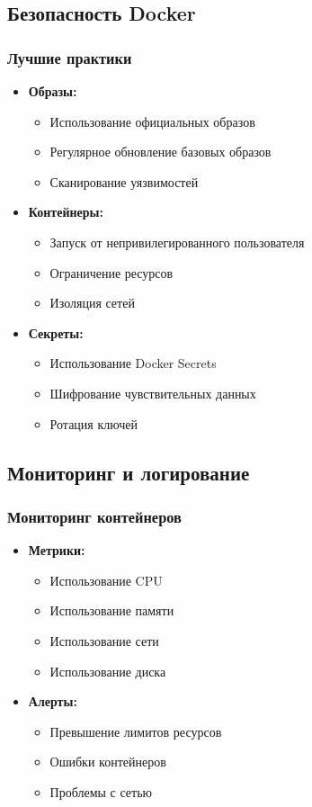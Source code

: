 \documentclass[12pt,a4paper]{article}
\begin{document}
\subsection{Безопасность Docker}
\subsubsection{Лучшие практики}
\begin{itemize}
    \item \textbf{Образы:}
    \begin{itemize}
        \item Использование официальных образов
        \item Регулярное обновление базовых образов
        \item Сканирование уязвимостей
    \end{itemize}
    \item \textbf{Контейнеры:}
    \begin{itemize}
        \item Запуск от непривилегированного пользователя
        \item Ограничение ресурсов
        \item Изоляция сетей
    \end{itemize}
    \item \textbf{Секреты:}
    \begin{itemize}
        \item Использование Docker Secrets
        \item Шифрование чувствительных данных
        \item Ротация ключей
    \end{itemize}
\end{itemize}

\subsection{Мониторинг и логирование}
\subsubsection{Мониторинг контейнеров}
\begin{itemize}
    \item \textbf{Метрики:}
    \begin{itemize}
        \item Использование CPU
        \item Использование памяти
        \item Использование сети
        \item Использование диска
    \end{itemize}
    \item \textbf{Алерты:}
    \begin{itemize}
        \item Превышение лимитов ресурсов
        \item Ошибки контейнеров
        \item Проблемы с сетью
    \end{itemize}
\end{itemize}
\end{document}
